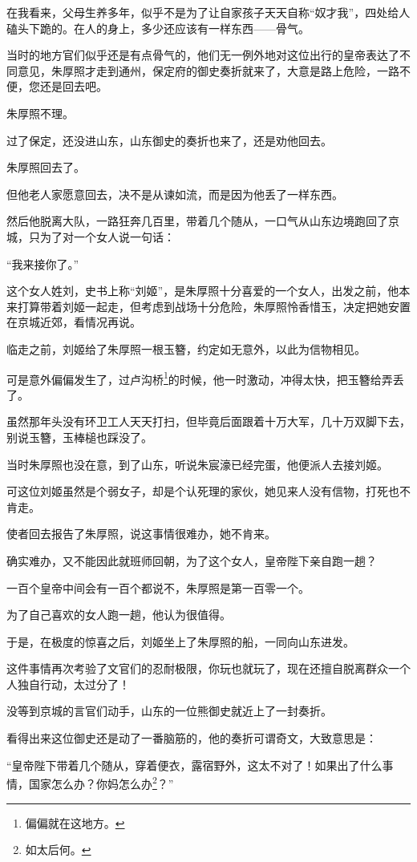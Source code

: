 \begin{multicols}{\theparacolNo}
		在我看来，父母生养多年，似乎不是为了让自家孩子天天自称“奴才我”，四处给人磕头下跪的。在人的身上，多少还应该有一样东西——骨气。

		当时的地方官们似乎还是有点骨气的，他们无一例外地对这位出行的皇帝表达了不同意见，朱厚照才走到通州，保定府的御史奏折就来了，大意是路上危险，一路不便，您还是回去吧。

		朱厚照不理。

		过了保定，还没进山东，山东御史的奏折也来了，还是劝他回去。

		朱厚照回去了。

		但他老人家愿意回去，决不是从谏如流，而是因为他丢了一样东西。

		然后他脱离大队，一路狂奔几百里，带着几个随从，一口气从山东边境跑回了京城，只为了对一个女人说一句话：

		“我来接你了。”

		这个女人姓刘，史书上称“刘姬”，是朱厚照十分喜爱的一个女人，出发之前，他本来打算带着刘姬一起走，但考虑到战场十分危险，朱厚照怜香惜玉，决定把她安置在京城近郊，看情况再说。

		临走之前，刘姬给了朱厚照一根玉簪，约定如无意外，以此为信物相见。

		可是意外偏偏发生了，过卢沟桥\footnote{偏偏就在这地方。}的时候，他一时激动，冲得太快，把玉簪给弄丢了。

		虽然那年头没有环卫工人天天打扫，但毕竟后面跟着十万大军，几十万双脚下去，别说玉簪，玉棒槌也踩没了。

		当时朱厚照也没在意，到了山东，听说朱宸濠已经完蛋，他便派人去接刘姬。

		可这位刘姬虽然是个弱女子，却是个认死理的家伙，她见来人没有信物，打死也不肯走。

		使者回去报告了朱厚照，说这事情很难办，她不肯来。

		确实难办，又不能因此就班师回朝，为了这个女人，皇帝陛下亲自跑一趟？

		一百个皇帝中间会有一百个都说不，朱厚照是第一百零一个。

		为了自己喜欢的女人跑一趟，他认为很值得。

		于是，在极度的惊喜之后，刘姬坐上了朱厚照的船，一同向山东进发。

		这件事情再次考验了文官们的忍耐极限，你玩也就玩了，现在还擅自脱离群众一个人独自行动，太过分了！

		没等到京城的言官们动手，山东的一位熊御史就近上了一封奏折。

		看得出来这位御史还是动了一番脑筋的，他的奏折可谓奇文，大致意思是：

		“皇帝陛下带着几个随从，穿着便衣，露宿野外，这太不对了！如果出了什么事情，国家怎么办？你妈怎么办\footnote{如太后何。}？”


\end{multicols}
